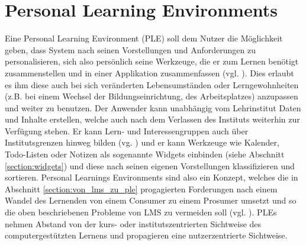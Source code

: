 \section{Personal Learning Environments}\label{section:ple_intro}
Eine Personal Learning Environment (PLE) soll dem Nutzer die Möglichkeit geben, dass System nach seinen Vorstellungen und Anforderungen zu personalisieren, sich also persönlich seine Werkzeuge, die er zum Lernen benötigt zusammenstellen und in einer Applikation zusammenfassen (vgl. \cite{VanHarmelen}). Dies erlaubt es ihm diese auch bei sich veränderten Lebensumständen oder Lerngewohnheiten (z.B. bei einem Wechsel der Bildungseinrichtung, des Arbeitsplatzes) anzupassen und weiter zu benutzen. Der Anwender kann unabhängig vom Lehrinstitut Daten und Inhalte erstellen, welche auch nach dem Verlassen des Instituts weiterhin zur Verfügung stehen. Er kann Lern- und Interessengruppen auch über Institutsgrenzen hinweg bilden (vg. \cite{Schaffert2008a}) und er kann Werkzeuge wie Kalender, Todo-Listen oder Notizen als sogenannte Widgets einbinden (siehe Abschnitt \ref{section:widgets}) und diese nach seinen eigenen Vorstellungen klassifizieren und sortieren. Personal Learnings Environments sind also ein Konzept, welches die in Abschnitt \ref{section:von_lms_zu_ple} progagierten Forderungen nach einem Wandel des Lernenden von einem Consumer zu einem Prosumer umsetzt und so die oben beschriebenen Probleme von LMS zu vermeiden soll (vgl. \cite{Attwell2007}). PLEs nehmen Abstand von der kurs- oder institutszentrierten Sichtweise des computergestützten Lernens und propagieren eine nutzerzentrierte Sichtweise.

